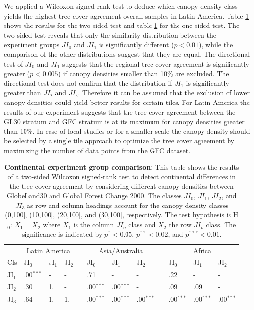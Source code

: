 			We applied a Wilcoxon signed-rank test to deduce which canopy density class yields the highest tree cover agreement overall samples in Latin America. Table \ref{tab:wilcoxontwosided_regions} shows the results for the two-sided test and table \ref{tab:wilcoxontwosided_regions} for the one-sided test. The two-sided test reveals that only the similarity distribution between the experiment groups $JI_0$ and $JI_1$ is significantly different ($p<0.01$), while the comparison of the other distributions suggest that they are equal. The directional test of $JI_0$ and $JI_1$ suggests that the regional tree cover agreement is significantly greater ($p<0.005$) if canopy densities smaller than 10\% are excluded. The directional test does not confirm that the distribution if $JI_1$ is significantly greater than $JI_2$ and $JI_3$. Therefore it can be assumed that the exclusion of lower canopy densities could yield better results for certain tiles. For Latin America the results of our experiment suggests that the tree cover agreement between the \ac{GL30} stratum and \ac{GFC} stratum is at its maximum for canopy densities greater than 10\%. In case of local studies or for a smaller scale the canopy density should be selected by a single tile approach to optimize the tree cover agreement by maximizing the number of data points from the \ac{GFC} dataset.
			\begin{table}[ht]
				\centering
				\caption[Continental experiment group comparison]{\textbf{Continental experiment group comparison:} This table shows the results of a two-sided Wilcoxon signed-rank test to detect continental differences in the tree cover agreement by considering different canopy densities between GlobeLand30 and Global Forest Change 2000. The classes $JI_0$, $JI_1$, $JI_2$, and $JI_3$ as row and column headings account for the canopy density classes (0,100], (10,100], (20,100], and (30,100], respectively. The test hypothesis is H$_0$: $X_1=X_2$ where $X_1$ is the column $JI_n$ class and $X_2$ the row $JI_n$ class. The significance is indicated by $p^{*}<0.05$, $p^{**}<0.02$, and $p^{***}<0.01$.}
				\label{tab:wilcoxontwosided_regions}
				\begin{tabular}{llllllllllll}
					\hline
					& \multicolumn{3}{c}{Latin America} && \multicolumn{3}{c}{Asia/Australia} && \multicolumn{3}{c}{Africa} \\\cline{2-4}\cline{6-8}\cline{10-12}
					Cls & JI$_0$ & JI$_1$ & JI$_2$ && JI$_0$ & JI$_1$ & JI$_2$ && JI$_0$ & JI$_1$ & JI$_2$ \\\hline
					JI$_1$ & .00$^{***}$ & - & - && .71 & - & - && .22 & - & - \\
					JI$_2$ & .30 & 1. & - && .00$^{***}$ & .00$^{***}$ & - && .09 & .09  & - \\
					JI$_3$ & .64 & 1. & 1. && .00$^{***}$ & .00$^{***}$ & .00$^{***}$ && .00$^{***}$ & .00$^{***}$ & .00$^{***}$ \\\hline
				\end{tabular}
			\end{table}

